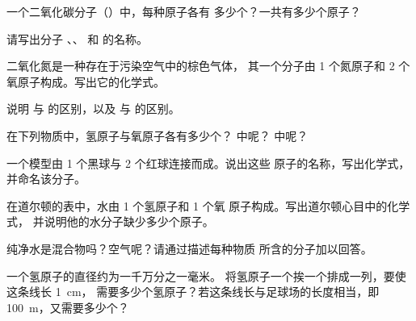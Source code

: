 \begin{exercise}[$\star$]\label{exo:g7:atoms-and-molecules:3}
一个二氧化碳分子（）中，每种原子各有
多少个？一共有多少个原子？
\end{exercise}

\begin{exercise}[$\star$]\label{exo:g7:atoms-and-molecules:4}
请写出分子 、、 和  的名称。
\end{exercise}

\begin{exercise}[$\star$]\label{exo:g7:atoms-and-molecules:5}
二氧化氮是一种存在于污染空气中的棕色气体，
其一个分子由 1 个氮原子和 2 个氧原子构成。写出它的化学式。
\end{exercise}

\begin{exercise}[$\star\star$]\label{exo:g7:atoms-and-molecules:6}
说明  与  的区别，以及 
与  的区别。
\end{exercise}

\begin{exercise}[$\star\star$]\label{exo:g7:atoms-and-molecules:7}
在下列物质中，氢原子与氧原子各有多少个？
 中呢？ 中呢？
\end{exercise}

\begin{exercise}[$\star\star$]\label{exo:g7:atoms-and-molecules:8}
一个模型由 1 个黑球与 2 个红球连接而成。说出这些
原子的名称，写出化学式，并命名该分子。
\end{exercise}

\begin{exercise}[$\star\star$]\label{exo:g7:atoms-and-molecules:9}
在道尔顿的表中，水由 1 个氢原子和 1 个氧
原子构成。写出道尔顿心目中的化学式，
并说明他的水分子缺少多少个原子。
\end{exercise}

\begin{exercise}[$\star\star$]\label{exo:g7:atoms-and-molecules:10}
纯净水是混合物吗？空气呢？请通过描述每种物质
所含的分子加以回答。
\end{exercise}

\begin{exercise}[$\star\star\star$]\label{exo:g7:atoms-and-molecules:11}
一个氢原子的直径约为一千万分之一毫米。
将氢原子一个挨一个排成一列，要使这条线长 \qty{1}{cm}，
需要多少个氢原子？若这条线长与足球场的长度相当，即 \qty{100}{m}，又需要多少个？
\end{exercise}

